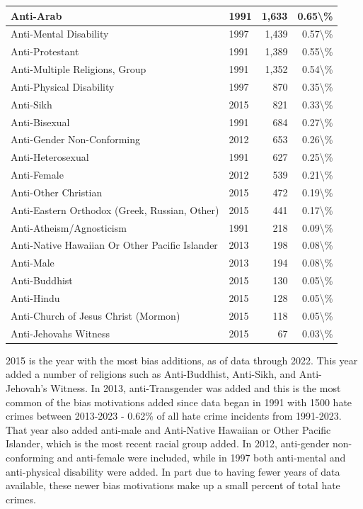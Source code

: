 \documentclass[
]{krantz}
\begin{document}
\begin{longtable}[t]{l|l|r|r}
\hline
Anti-Arab & 1991 & 1,633 & 0.65\textbackslash{}\%\\
\hline
Anti-Mental Disability & 1997 & 1,439 & 0.57\textbackslash{}\%\\
\hline
Anti-Protestant & 1991 & 1,389 & 0.55\textbackslash{}\%\\
\hline
Anti-Multiple Religions, Group & 1991 & 1,352 & 0.54\textbackslash{}\%\\
\hline
Anti-Physical Disability & 1997 & 870 & 0.35\textbackslash{}\%\\
\hline
Anti-Sikh & 2015 & 821 & 0.33\textbackslash{}\%\\
\hline
Anti-Bisexual & 1991 & 684 & 0.27\textbackslash{}\%\\
\hline
Anti-Gender Non-Conforming & 2012 & 653 & 0.26\textbackslash{}\%\\
\hline
Anti-Heterosexual & 1991 & 627 & 0.25\textbackslash{}\%\\
\hline
Anti-Female & 2012 & 539 & 0.21\textbackslash{}\%\\
\hline
Anti-Other Christian & 2015 & 472 & 0.19\textbackslash{}\%\\
\hline
Anti-Eastern Orthodox (Greek, Russian, Other) & 2015 & 441 & 0.17\textbackslash{}\%\\
\hline
Anti-Atheism/Agnosticism & 1991 & 218 & 0.09\textbackslash{}\%\\
\hline
Anti-Native Hawaiian Or Other Pacific Islander & 2013 & 198 & 0.08\textbackslash{}\%\\
\hline
Anti-Male & 2013 & 194 & 0.08\textbackslash{}\%\\
\hline
Anti-Buddhist & 2015 & 130 & 0.05\textbackslash{}\%\\
\hline
Anti-Hindu & 2015 & 128 & 0.05\textbackslash{}\%\\
\hline
Anti-Church of Jesus Christ (Mormon) & 2015 & 118 & 0.05\textbackslash{}\%\\
\hline
Anti-Jehovahs Witness & 2015 & 67 & 0.03\textbackslash{}\%\\
\hline
\end{longtable}

2015 is the year with the most bias additions, as of data
through 2022. This year added a number of religions such as
Anti-Buddhist, Anti-Sikh, and Anti-Jehovah's Witness. In
2013, anti-Transgender was added and this is the most common
of the bias motivations added since data began in 1991 with
1500 hate crimes between 2013-2023 - 0.62\% of all hate
crime incidents from 1991-2023. That year also added
anti-male and Anti-Native Hawaiian or Other Pacific
Islander, which is the most recent racial group added. In
2012, anti-gender non-conforming and anti-female were
included, while in 1997 both anti-mental and anti-physical
disability were added. In part due to having fewer years of
data available, these newer bias motivations make up a small
percent of total hate crimes.
\end{document}
